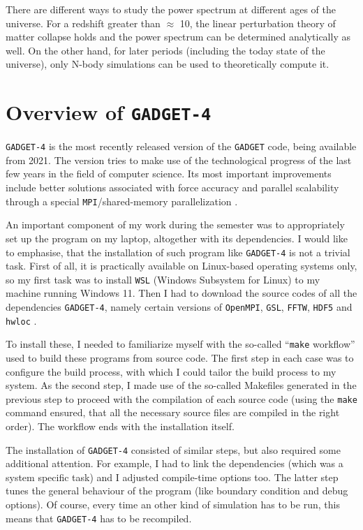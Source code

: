 \documentclass[12pt]{article}
\begin{document}
There are different ways to study the power spectrum at different ages of the universe. For a redshift greater than $\approx$ 10, the linear perturbation theory of matter collapse holds and the power spectrum can be determined analytically as well. On the other hand, for later periods (including the today state of the universe), only N-body simulations can be used to theoretically compute it.

\section{Overview of \texttt{GADGET-4}}
\texttt{GADGET-4} is the most recently released version of the \texttt{GADGET} code, being available from 2021. The version tries to make use of the technological progress of the last few years in the field of computer science. Its most important improvements include better solutions associated with force accuracy and parallel scalability through a special \texttt{MPI}/shared-memory parallelization \cite{Springel2021Gadget4}.

An important component of my work during the semester was to appropriately set up the program on my laptop, altogether with its dependencies. I would like to emphasise, that the installation of such program like \texttt{GADGET-4} is not a trivial task. First of all, it is practically available on Linux-based operating systems only, so my first task was to install \texttt{WSL} (Windows Subsystem for Linux) to my machine running Windows 11. Then I had to download the source codes of all the dependencies \texttt{GADGET-4}, namely certain versions of \texttt{OpenMPI}, \texttt{GSL}, \texttt{FFTW}, \texttt{HDF5} and \texttt{hwloc} \cite{masterdesky}.

To install these, I needed to familiarize myself with the so-called ``\texttt{make} workflow'' used to build these programs from source code. The first step in each case was to configure the build process, with which I could tailor the build process to my system. As the second step, I made use of the so-called Makefiles generated in the previous step to proceed with the compilation of each source code (using the \texttt{make} command ensured, that all the necessary source files are compiled in the right order). The workflow ends with the installation itself.

The installation of \texttt{GADGET-4} consisted of similar steps, but also required some additional attention. For example, I had to link the dependencies (which was a system specific task) and I adjusted compile-time options too. The latter step tunes the general behaviour of the program (like boundary condition and debug options). Of course, every time an other kind of simulation has to be run, this means that \texttt{GADGET-4} has to be recompiled.
\end{document}
